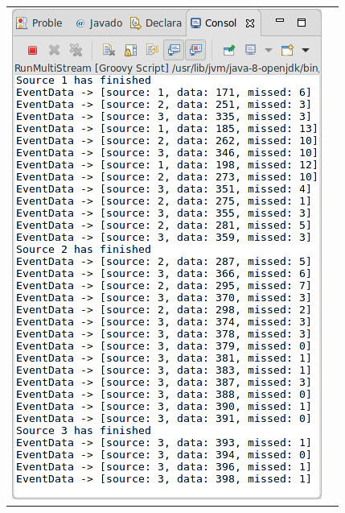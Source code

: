 \begin{tabular}{c|c}
	\includegraphics[width=\textwidth/2]{img/screenshots/9-3-3-2.png} \\

\end{tabular}
